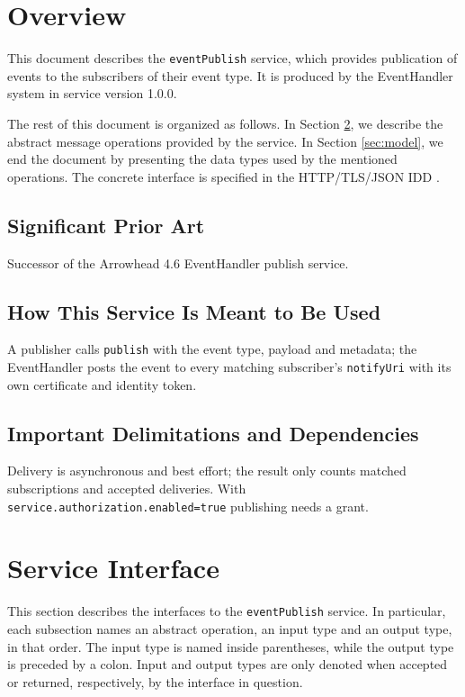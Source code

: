 \documentclass[a4paper]{arrowhead}
\begin{document}
\section{Overview}
\label{sec:overview}

This document describes the \texttt{eventPublish} service, which provides publication of events to the subscribers of their event type.
It is produced by the EventHandler system \cite{eh-sysd} in service version 1.0.0.

The rest of this document is organized as follows.
In Section \ref{sec:operations}, we describe the abstract message operations provided by the service.
In Section \ref{sec:model}, we end the document by presenting the data types used by the mentioned operations.
The concrete interface is specified in the HTTP/TLS/JSON IDD \cite{eh-eventPublish-http-idd}.

\subsection{Significant Prior Art}

Successor of the Arrowhead 4.6 EventHandler publish service.

\subsection{How This Service Is Meant to Be Used}

A publisher calls \texttt{publish} with the event type, payload and metadata; the EventHandler posts the event to every matching subscriber's \texttt{notifyUri} with its own certificate and identity token.

\subsection{Important Delimitations and Dependencies}
\label{sec:delimitations}

Delivery is asynchronous and best effort; the result only counts matched subscriptions and accepted deliveries. With \texttt{service.\allowbreak{}authorization.\allowbreak{}enabled=\allowbreak{}true} publishing needs a grant.

\newpage

\section{Service Interface}
\label{sec:operations}

This section describes the interfaces to the \texttt{eventPublish} service.
In particular, each subsection names an abstract operation, an input type and an output type, in that order.
The input type is named inside parentheses, while the output type is preceded by a colon.
Input and output types are only denoted when accepted or returned, respectively, by the interface in question.
\end{document}
